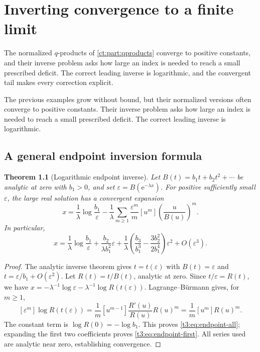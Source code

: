 \documentclass[11pt,openany]{book}
\numberwithin{equation}{chapter}
\theoremstyle{plain}
\newtheorem{theorem}{Theorem}[chapter]
\theoremstyle{definition}
\theoremstyle{remark}
\newcommand{\ee}{\mathrm e}
\newcommand{\coefB}[2]{[#1^{#2}]}             %
\newcommand{\eps}{\varepsilon}
\begin{document}
\chapter{Inverting convergence to a finite limit}
\label{ct:ch:endpoint}

The normalized $q$-products of \cref{ct:part:qproducts} converge to positive
constants, and their inverse problem asks how large an index is needed to
reach a small prescribed deficit.  The correct leading inverse is
logarithmic, and the convergent tail makes every correction explicit.

\label{t3:sec:endpoint}

The previous examples grow without bound, but their normalized versions often converge to positive constants. Their inverse problem asks how large an index is needed to reach a small prescribed deficit. The correct leading inverse is logarithmic.

\section{A general endpoint inversion formula}

\begin{theorem}[Logarithmic endpoint inverse]\label{t3:thm:endpoint}
Let $B(t)=b_1t+b_2t^2+\cdots$ be analytic at zero with $b_1>0$, and set
$\eps=B(\ee^{-\lambda x})$. For positive sufficiently small $\eps$, the large real solution has a convergent expansion
\begin{equation}\label{t3:eq:endpoint-all}
 \boxed{\displaystyle
 x=\frac1\lambda\log\frac{b_1}{\eps}
 -\frac1\lambda\sum_{m\ge1}\frac{\eps^m}{m}
     \coefB{u}{m}\left(\frac{u}{B(u)}\right)^m.}
\end{equation}
In particular,
\begin{equation}\label{t3:eq:endpoint-first}
 x=\frac1\lambda\log\frac{b_1}{\eps}
  +\frac{b_2}{\lambda b_1^2}\eps
  +\frac1\lambda\left(\frac{b_3}{b_1^3}
             -\frac{3b_2^2}{2b_1^4}\right)\eps^2
  +O(\eps^3).
\end{equation}
\end{theorem}
\begin{proof}
The analytic inverse theorem gives $t=t(\eps)$ with $B(t)=\eps$ and
$t=\eps/b_1+O(\eps^2)$. Let $R(t)=t/B(t)$, analytic at zero. Since
$t/\eps=R(t)$, we have
$x=-\lambda^{-1}\log\eps-\lambda^{-1}\log R(t(\eps))$.
Lagrange--B\"urmann gives, for $m\ge1$,
\[
 [\eps^m]\log R(t(\eps))
 =\frac1m[u^{m-1}]\frac{R'(u)}{R(u)}R(u)^m
 =\frac1m[u^m]R(u)^m.
\]
The constant term is $\log R(0)=-\log b_1$. This proves \eqref{t3:eq:endpoint-all}; expanding the first two coefficients proves \eqref{t3:eq:endpoint-first}. All series used are analytic near zero, establishing convergence.
\end{proof}
\end{document}
